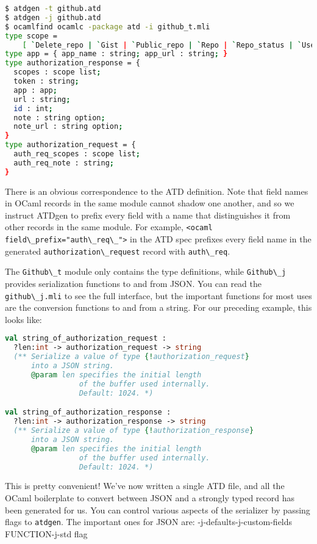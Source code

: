 \begin{lstlisting}[language=bash]
$ atdgen -t github.atd
$ atdgen -j github.atd
$ ocamlfind ocamlc -package atd -i github_t.mli
type scope =
    [ `Delete_repo | `Gist | `Public_repo | `Repo | `Repo_status | `User ]
type app = { app_name : string; app_url : string; }
type authorization_response = {
  scopes : scope list;
  token : string;
  app : app;
  url : string;
  id : int;
  note : string option;
  note_url : string option;
}
type authorization_request = {
  auth_req_scopes : scope list;
  auth_req_note : string;
}
\end{lstlisting}

There is an obvious correspondence to the ATD definition. Note that
field names in OCaml records in the same module cannot shadow one
another, and so we instruct ATDgen to prefix every field with a name
that distinguishes it from other records in the same module. For
example, \passthrough{\lstinline!<ocaml field\_prefix="auth\_req\_">!}
in the ATD spec prefixes every field name in the generated
\passthrough{\lstinline!authorization\_request!} record with
\passthrough{\lstinline!auth\_req!}.

The \passthrough{\lstinline!Github\_t!} module only contains the type
definitions, while \passthrough{\lstinline!Github\_j!} provides
serialization functions to and from JSON. You can read the
\passthrough{\lstinline!github\_j.mli!} to see the full interface, but
the important functions for most uses are the conversion functions to
and from a string. For our preceding example, this looks like:

\begin{lstlisting}[language=Caml]
val string_of_authorization_request :
  ?len:int -> authorization_request -> string
  (** Serialize a value of type {!authorization_request}
      into a JSON string.
      @param len specifies the initial length
                 of the buffer used internally.
                 Default: 1024. *)

val string_of_authorization_response :
  ?len:int -> authorization_response -> string
  (** Serialize a value of type {!authorization_response}
      into a JSON string.
      @param len specifies the initial length
                 of the buffer used internally.
                 Default: 1024. *)
\end{lstlisting}

This is pretty convenient! We've now written a single ATD file, and all
the OCaml boilerplate to convert between JSON and a strongly typed
record has been generated for us. You can control various aspects of the
serializer by passing flags to \passthrough{\lstinline!atdgen!}. The
important ones for JSON are: {-j-defaults}{-j-custom-fields
FUNCTION}{-j-std flag}

